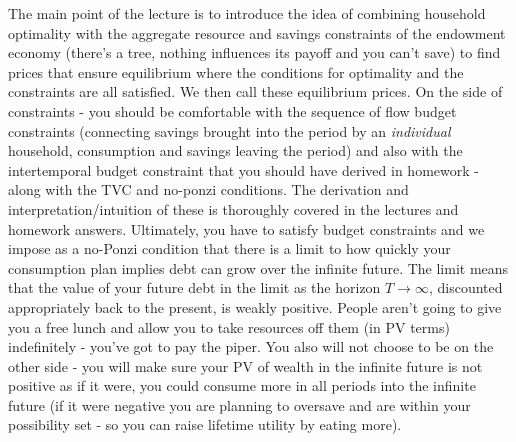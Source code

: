 \documentclass[authoryear,11pt]{elsarticle}
\begin{document}
The main point of the lecture is to introduce the idea of combining household optimality with the aggregate resource and savings constraints of the endowment economy (there's a tree, nothing influences its payoff and you can't save) to find prices that ensure equilibrium where the conditions for optimality and the constraints are all satisfied. We then call these equilibrium prices. On the side of constraints - you should be comfortable with the sequence of flow budget constraints (connecting savings brought into the period by an \textit{individual} household, consumption and savings leaving the period) and also with the intertemporal budget constraint that you should have derived in homework - along with the TVC and no-ponzi conditions. The derivation and interpretation/intuition of these is thoroughly covered in the lectures and homework answers. Ultimately, you have to satisfy budget constraints and we impose as a no-Ponzi condition that there is a limit to how quickly your consumption plan implies debt can grow over the infinite future. The limit means that the value of your future debt in the limit as the horizon $T\rightarrow \infty$, discounted appropriately back to the present, is weakly positive. People aren't going to give you a free lunch and allow you to take resources off them (in PV terms) indefinitely - you've got to pay the piper. You also will not choose to be on the other side - you will make sure your PV of wealth in the infinite future is not positive as if it were, you could consume more in all periods into the infinite future (if it were negative you are planning to oversave and are within your possibility set - so you can raise lifetime utility by eating more).
\end{document}

